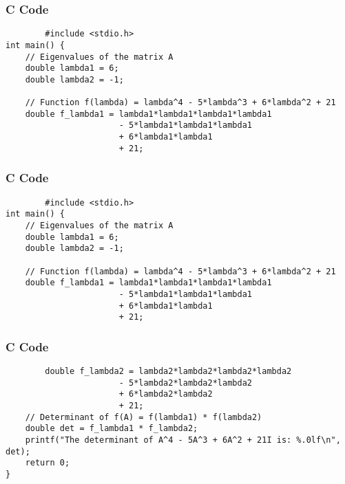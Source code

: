 \documentclass{beamer}
\begin{document}
\begin{frame}[fragile]
    \frametitle{C Code}
    \begin{lstlisting}
        #include <stdio.h>
int main() {
    // Eigenvalues of the matrix A
    double lambda1 = 6;
    double lambda2 = -1;

    // Function f(lambda) = lambda^4 - 5*lambda^3 + 6*lambda^2 + 21
    double f_lambda1 = lambda1*lambda1*lambda1*lambda1 
                       - 5*lambda1*lambda1*lambda1 
                       + 6*lambda1*lambda1 
                       + 21;
    \end{lstlisting}
\end{frame}
\begin{frame}[fragile]
    \frametitle{C Code}
    \begin{lstlisting}
        #include <stdio.h>
int main() {
    // Eigenvalues of the matrix A
    double lambda1 = 6;
    double lambda2 = -1;

    // Function f(lambda) = lambda^4 - 5*lambda^3 + 6*lambda^2 + 21
    double f_lambda1 = lambda1*lambda1*lambda1*lambda1 
                       - 5*lambda1*lambda1*lambda1 
                       + 6*lambda1*lambda1 
                       + 21;
    \end{lstlisting}
\end{frame}
\begin{frame}[fragile]
    \frametitle{C Code}
    \begin{lstlisting}
        double f_lambda2 = lambda2*lambda2*lambda2*lambda2 
                       - 5*lambda2*lambda2*lambda2 
                       + 6*lambda2*lambda2 
                       + 21;
    // Determinant of f(A) = f(lambda1) * f(lambda2)
    double det = f_lambda1 * f_lambda2;
    printf("The determinant of A^4 - 5A^3 + 6A^2 + 21I is: %.0lf\n", det);
    return 0;
}
    \end{lstlisting}
\end{frame}
\end{document}
